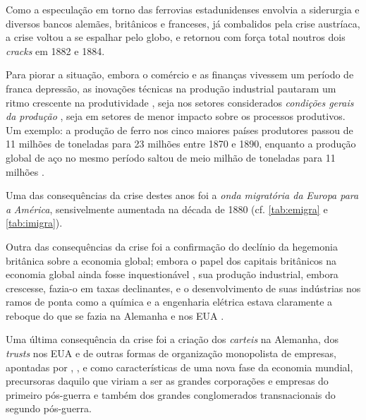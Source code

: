 Como a especulação em torno das ferrovias estadunidenses envolvia a siderurgia e diversos bancos alemães, britânicos e franceses, já combalidos pela crise austríaca, a crise voltou a se espalhar pelo globo, e retornou com força total noutros dois \textit{cracks} em 1882 e 1884.

Para piorar a situação, embora o comércio e as finanças vivessem um período de franca depressão, as inovações técnicas na produção industrial pautaram um ritmo crescente na produtividade \cite{hobsbawm_empire_1989}, seja nos setores considerados \textit{condições gerais da produção} \cite[p.~155-162]{BERNARDO1991}, seja em setores de menor impacto sobre os processos produtivos. Um exemplo: a produção de ferro nos cinco maiores países produtores passou de 11 milhões de toneladas para 23 milhões entre 1870 e 1890, enquanto a produção global de aço no mesmo período saltou de meio milhão de toneladas para 11 milhões \cite[p.~35]{hobsbawm_empire_1989}.

Uma das consequências da crise destes anos foi a \textit{onda migratória da} \textit{Europa para a }\textit{América}, sensivelmente aumentada na década de 1880 (cf. \autoref{tab:emigra} e \autoref{tab:imigra}).





Outra das consequências da crise foi a confirmação do declínio da hegemonia britânica sobre a economia global; embora o papel dos capitais britânicos na economia global ainda fosse inquestionável \cite{goetzmann_british_2006,rippy_britlat_1954,stone_british_1977}, sua produção industrial, embora crescesse, fazia-o em taxas declinantes, e o desenvolvimento de suas indústrias nos ramos de ponta como a química e a engenharia elétrica estava claramente a reboque do que se fazia na Alemanha e nos EUA \cite[p.~207]{Musson1959}. 

Uma última consequência da crise foi a criação dos \textit{carteis} na Alemanha, dos \textit{trusts} nos EUA e de outras formas de organização monopolista de empresas, apontadas por , , e  como características de uma nova fase da economia mundial, precursoras daquilo que viriam a ser as grandes corporações e empresas do primeiro pós-guerra e também dos grandes conglomerados transnacionais do segundo pós-guerra.

